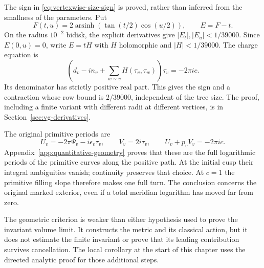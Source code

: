 The sign in \eqref{eq:vertexwise-size-sign} is proved, rather than
inferred from the smallness of the parameters. Put
\[
 F(t,u)=2\operatorname{arsinh}(\tan(t/2)\cos(u/2)),\qquad E=F-t.
\]
On the radius $10^{-2}$ bidisk, the explicit derivatives give
$|E_t|,|E_u|<1/39000$. Since $E(0,u)=0$, write $E=tH$
with $H$ holomorphic and $|H|<1/39000$. The charge equation is
\[
 \left(d_v-in_v+\sum_{w\sim v}H(\tau_v,\tau_w)\right)\tau_v
       =-2\pi ic.
\]
Its denominator has strictly positive real part. This gives the
sign and a contraction whose row bound is $2/39000$, independent
of the tree size. The proof, including a finite variant with
different radii at different vertices, is in
Section~\ref{sec:vg-derivatives}.

The original primitive periods are
\begin{equation}\label{eq:vertexwise-periods}
 U_v=-2\pi\Psi_v-i\epsilon_v\tau_v,\qquad
 V_v=2i\tau_v,\qquad U_v+p_vV_v=-2\pi ic.
\end{equation}
Appendix~\ref{app:quantitative-geometry} proves that these are
the full logarithmic periods of the primitive curves along the
positive path. At the initial
cusp their integral ambiguities vanish; continuity preserves that
choice. At $c=1$ the primitive filling slope therefore makes one
full turn. The conclusion concerns the original marked exterior,
even if a total meridian logarithm has moved far from zero.

The geometric criterion is weaker than either hypothesis used to
prove the invariant volume limit. It constructs the metric and its
classical action, but it does not estimate the finite invariant or
prove that its leading contribution survives cancellation. The local
corollary at the start of this chapter uses the directed analytic
proof for those additional steps.
